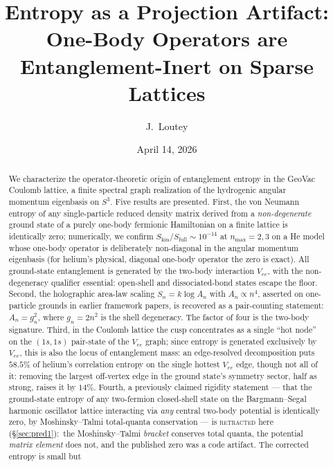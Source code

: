 \documentclass[twocolumn,pra,amsmath,amssymb,superscriptaddress]{revtex4-2}
\begin{document}
\title{Entropy as a Projection Artifact:\\
One-Body Operators are Entanglement-Inert on Sparse Lattices}

\author{J.~Loutey}

\date{April 14, 2026}

\begin{abstract}
We characterize the operator-theoretic origin of entanglement
entropy in the GeoVac Coulomb lattice, a finite spectral graph
realization of the hydrogenic angular momentum eigenbasis on
$S^{3}$.  Five results are presented.  First, the von Neumann
entropy of any single-particle reduced density matrix derived from
a \emph{non-degenerate} ground state of a purely one-body fermionic
Hamiltonian on a finite lattice is identically zero; numerically,
we confirm $S_{\mathrm{kin}}/S_{\mathrm{full}} \sim 10^{-14}$ at
$n_{\max}=2,3$ on a He model whose one-body operator is deliberately
non-diagonal in the angular momentum eigenbasis (for helium's physical,
diagonal one-body operator the zero is exact).  All
ground-state entanglement is generated by the two-body interaction
$V_{ee}$, with the non-degeneracy qualifier essential: open-shell
and dissociated-bond states escape the floor.  Second, the
holographic area-law scaling $S_n = k\log A_n$ with
$A_n\propto n^{4}$, asserted on one-particle grounds in earlier
framework papers, is recovered as a pair-counting
statement: $A_n=g_n^{2}$, where $g_n=2n^{2}$ is the shell
degeneracy.  The factor of four is the two-body signature.
Third, in the Coulomb lattice the cusp concentrates as a single
``hot node'' on the $(1s,1s)$ pair-state of the $V_{ee}$ graph;
since entropy is generated exclusively by $V_{ee}$, this is also the
locus of entanglement mass: an edge-resolved decomposition puts
$58.5\%$ of helium's correlation entropy on the single hottest $V_{ee}$
edge, though not all of it: removing the largest off-vertex edge in
the ground state's symmetry sector, half as strong, raises it by
$14\%$.  Fourth, a
previously claimed rigidity statement --- that the ground-state
entropy of any two-fermion closed-shell state on the
Bargmann--Segal harmonic oscillator lattice interacting via
\emph{any} central two-body potential is identically zero, by
Moshinsky--Talmi total-quanta conservation --- is
\textsc{retracted} here (\S\ref{sec:pred1}):\ the
Moshinsky--Talmi \emph{bracket} conserves total quanta, the
potential \emph{matrix element} does not, and the published
zero was a code artifact.  The corrected entropy is small but

\end{abstract}
\end{document}
